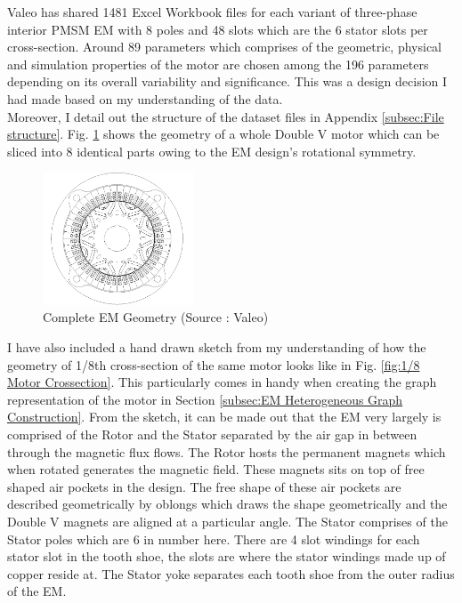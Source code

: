 \documentclass{report} %
\begin{document}
Valeo has shared 1481 Excel Workbook files for each variant of three-phase interior \ac{PMSM} \ac{EM} with 8 poles and 48 slots which are the 6 stator slots per cross-section. 
Around 89 parameters which comprises of the geometric, physical and simulation properties of the motor are chosen among the 196 parameters depending on its overall variability and significance.
This was a design decision I had made based on my understanding of the data.\\
Moreover, I detail out the structure of the dataset files in Appendix \ref{subsec:File structure}.
Fig. \ref{fig:Full Motor} shows the geometry of a whole Double V motor which can be sliced into 8 identical parts owing to the \ac{EM} design's rotational symmetry.
\begin{figure}[H]
    \centering
    \includegraphics[width=0.4\textwidth]{./ReportImages/FullMotorv2.png} 
    \caption{Complete \ac{EM} Geometry (Source : Valeo)}
    \label{fig:Full Motor}
\end{figure}

I have also included a hand drawn sketch from my understanding of how the geometry of 1/8th cross-section of the same motor looks like in Fig. \ref{fig:1/8 Motor Crossection}.
This particularly comes in handy when creating the graph representation of the motor in Section \ref{subsec:EM Heterogeneous Graph Construction}.
From the sketch, it can be made out that the \ac{EM} very largely is comprised of the Rotor and the Stator separated by the air gap in between through the magnetic flux flows.
The Rotor hosts the permanent magnets which when rotated generates the magnetic field. These magnets sits on top of free shaped air pockets in the design. 
The free shape of these air pockets are described geometrically by oblongs which draws the shape geometrically and the Double V magnets are aligned at a particular angle. 
The Stator comprises of the Stator poles which are 6 in number here. There are 4 slot windings for each stator slot in the tooth shoe, the slots are where the stator windings made 
up of copper reside at. The Stator yoke separates each tooth shoe from the outer radius of the \ac{EM}.
\end{document}
